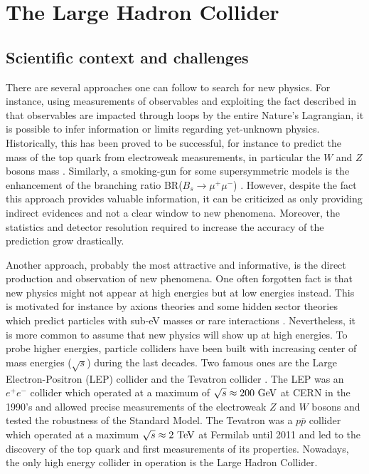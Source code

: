     \section{The Large Hadron Collider \label{sec:LHCintro}}

    \subsection{Scientific context and challenges}

    There are several approaches one can follow to search for new physics. For instance, using
     measurements of observables and exploiting the fact described in
     that observables are impacted through loops by
    the entire Nature's Lagrangian, it is possible to infer information or limits regarding
    yet-unknown physics. Historically, this has been proved to be successful,
    for instance to predict the mass of the top quark from electroweak measurements, in particular
    the $W$ and $Z$ bosons mass \cite{discoveryOfTopQuark}. Similarly, a smoking-gun for some supersymmetric
    models is the enhancement of the branching ratio BR($B_s \rightarrow \mu^+\mu^-$)
    \cite{BsToMuMu}. However,
    despite the fact this approach provides valuable information, it can be criticized as
    only providing indirect evidences and not a clear window to new phenomena. Moreover,
    the statistics and detector resolution required to increase the accuracy of the
    prediction grow drastically.

    Another approach, probably the most attractive and informative, is the direct production and observation of
    new phenomena. One often forgotten fact is that new physics might not appear at high
    energies but at low energies instead. This is motivated for instance by axions
    theories and some hidden sector theories which predict particles with sub-eV masses
    or rare interactions \cite{PolarizedHelium, CavityForHiddenPhotons}. Nevertheless, it
    is more common to assume that new physics will show up at high energies. To probe
    higher energies, particle colliders have been
    built with increasing center of mass energies ($\sqrt{s}$) during the last decades.
    Two famous ones are the Large Electron-Positron (LEP) collider \cite{LEP} and the
    Tevatron collider \cite{Tevatron}. The
    LEP was an $e^+e^-$ collider which operated at a maximum of $\sqrt{s} \approx 200~\text{GeV}$
    at CERN in the 1990's and allowed precise measurements of the electroweak $Z$ and $W$
    bosons and tested the robustness of the Standard Model. The Tevatron was a $p\bar{p}$
    collider which operated at a maximum $\sqrt{s} \approx 2~\text{TeV}$ at Fermilab until 2011
    and led to the discovery of the top quark and first measurements of its properties.
    Nowadays, the only high energy collider in operation is the Large Hadron Collider.

